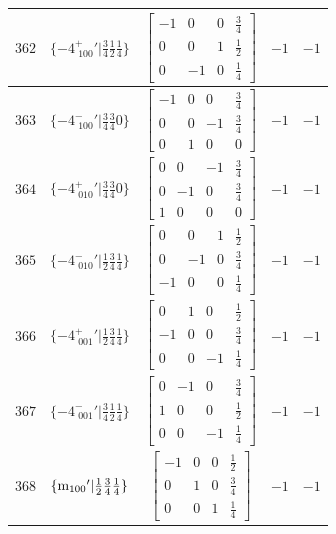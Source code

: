 \documentclass[fleqn,8pt]{jsarticle}
\begin{document}
\begin{longtable}{ccccc}
$ 362 $ & $ \{-4^{+}_{\,\,100}{}'|\frac{3}{4} \frac{1}{2} \frac{1}{4}\} $ & $ \begin{bmatrix} -1 & 0 & 0 & \frac{3}{4} \\ 0 & 0 & 1 & \frac{1}{2} \\ 0 & -1 & 0 & \frac{1}{4} \end{bmatrix} $ & $ -1 $ & $ -1 $ \\ \hline
$ 363 $ & $ \{-4^{-}_{\,\,100}{}'|\frac{3}{4} \frac{3}{4} 0\} $ & $ \begin{bmatrix} -1 & 0 & 0 & \frac{3}{4} \\ 0 & 0 & -1 & \frac{3}{4} \\ 0 & 1 & 0 & 0 \end{bmatrix} $ & $ -1 $ & $ -1 $ \\ \hline
$ 364 $ & $ \{-4^{+}_{\,\,010}{}'|\frac{3}{4} \frac{3}{4} 0\} $ & $ \begin{bmatrix} 0 & 0 & -1 & \frac{3}{4} \\ 0 & -1 & 0 & \frac{3}{4} \\ 1 & 0 & 0 & 0 \end{bmatrix} $ & $ -1 $ & $ -1 $ \\ \hline
$ 365 $ & $ \{-4^{-}_{\,\,010}{}'|\frac{1}{2} \frac{3}{4} \frac{1}{4}\} $ & $ \begin{bmatrix} 0 & 0 & 1 & \frac{1}{2} \\ 0 & -1 & 0 & \frac{3}{4} \\ -1 & 0 & 0 & \frac{1}{4} \end{bmatrix} $ & $ -1 $ & $ -1 $ \\ \hline
$ 366 $ & $ \{-4^{+}_{\,\,001}{}'|\frac{1}{2} \frac{3}{4} \frac{1}{4}\} $ & $ \begin{bmatrix} 0 & 1 & 0 & \frac{1}{2} \\ -1 & 0 & 0 & \frac{3}{4} \\ 0 & 0 & -1 & \frac{1}{4} \end{bmatrix} $ & $ -1 $ & $ -1 $ \\ \hline
$ 367 $ & $ \{-4^{-}_{\,\,001}{}'|\frac{3}{4} \frac{1}{2} \frac{1}{4}\} $ & $ \begin{bmatrix} 0 & -1 & 0 & \frac{3}{4} \\ 1 & 0 & 0 & \frac{1}{2} \\ 0 & 0 & -1 & \frac{1}{4} \end{bmatrix} $ & $ -1 $ & $ -1 $ \\ \hline
$ 368 $ & $ \{{\rm m}_{100}{}'|\frac{1}{2} \frac{3}{4} \frac{1}{4}\} $ & $ \begin{bmatrix} -1 & 0 & 0 & \frac{1}{2} \\ 0 & 1 & 0 & \frac{3}{4} \\ 0 & 0 & 1 & \frac{1}{4} \end{bmatrix} $ & $ -1 $ & $ -1 $ \\ \hline

\end{longtable}
\end{document}
